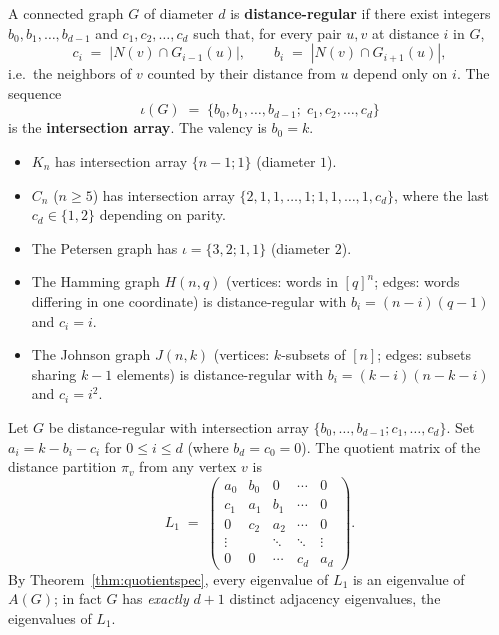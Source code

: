 \begin{definition}\label{def:drg}
A connected graph $G$ of diameter $d$ is \textbf{distance-regular}
if there exist integers $b_0, b_1, \ldots, b_{d-1}$ and
$c_1, c_2, \ldots, c_d$ such that, for every pair $u, v$ at distance
$i$ in $G$,
\[
  c_i \;=\; |N(v) \cap G_{i-1}(u)|,
  \qquad
  b_i \;=\; |N(v) \cap G_{i+1}(u)|,
\]
i.e.\ the neighbors of $v$ counted by their distance from $u$ depend
only on $i$. The sequence
\[
  \iota(G) \;=\; \{b_0, b_1, \ldots, b_{d-1};\; c_1, c_2, \ldots, c_d\}
\]
is the \textbf{intersection array}. The valency is $b_0 = k$.
\end{definition}

\begin{example}
\mbox{}
\begin{itemize}
  \item $K_n$ has intersection array $\{n - 1; 1\}$ (diameter $1$).
  \item $C_n$ ($n \ge 5$) has intersection array
        $\{2, 1, 1, \ldots, 1; 1, 1, \ldots, 1, c_d\}$, where the last
        $c_d \in \{1, 2\}$ depending on parity.
  \item The Petersen graph has $\iota = \{3, 2; 1, 1\}$ (diameter $2$).
  \item The Hamming graph $H(n, q)$ (vertices: words in $[q]^n$;
        edges: words differing in one coordinate) is distance-regular
        with $b_i = (n - i)(q - 1)$ and $c_i = i$.
  \item The Johnson graph $J(n, k)$ (vertices: $k$-subsets of $[n]$;
        edges: subsets sharing $k - 1$ elements) is distance-regular
        with $b_i = (k - i)(n - k - i)$ and $c_i = i^2$.
\end{itemize}
\end{example}

\begin{theorem}\label{thm:drgquot}
Let $G$ be distance-regular with intersection array
$\{b_0, \ldots, b_{d-1}; c_1, \ldots, c_d\}$. Set $a_i = k - b_i - c_i$
for $0 \le i \le d$ (where $b_d = c_0 = 0$). The quotient matrix of
the distance partition $\pi_v$ from any vertex $v$ is
\[
  L_1 \;=\;
  \begin{pmatrix}
    a_0 & b_0 & 0 & \cdots & 0 \\
    c_1 & a_1 & b_1 & \cdots & 0 \\
    0 & c_2 & a_2 & \cdots & 0 \\
    \vdots & & \ddots & \ddots & \vdots \\
    0 & 0 & \cdots & c_d & a_d
  \end{pmatrix}.
\]
By Theorem~\ref{thm:quotientspec}, every eigenvalue of $L_1$ is an
eigenvalue of $A(G)$; in fact $G$ has \emph{exactly} $d + 1$ distinct
adjacency eigenvalues, the eigenvalues of $L_1$.
\end{theorem}

